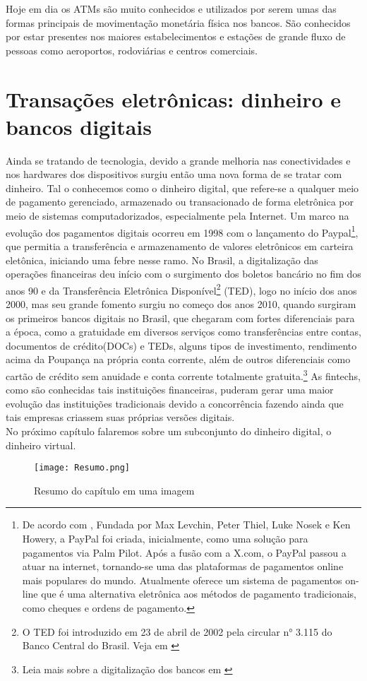 Hoje em dia os ATMs são muito conhecidos e utilizados por serem  umas das formas principais de movimentação monetária física nos  bancos. São conhecidos por estar presentes nos maiores estabelecimentos e estações de grande fluxo de pessoas como aeroportos, rodoviárias e centros comerciais. 



\section{Transações eletrônicas: dinheiro e bancos digitais}
Ainda se tratando de tecnologia, devido a grande melhoria nas conectividades e nos hardwares dos dispositivos surgiu então uma nova forma de se tratar com dinheiro. Tal o conhecemos como o dinheiro digital, que refere-se a qualquer meio de pagamento gerenciado, armazenado ou transacionado de forma eletrônica por meio de sistemas computadorizados, especialmente pela Internet. 
Um marco na evolução dos pagamentos digitais ocorreu em 1998 com o lançamento do Paypal\footnote{De acordo com	 \cite{CTECH}, Fundada por Max Levchin, Peter Thiel, Luke Nosek e Ken Howery, a PayPal foi criada, inicialmente, como uma solução para pagamentos via Palm Pilot. Após a fusão com a X.com, o PayPal passou a atuar na internet, tornando-se uma das plataformas de pagamentos online mais populares do mundo. Atualmente oferece um sistema de pagamentos on-line que é uma alternativa eletrônica aos métodos de pagamento tradicionais, como cheques e ordens de pagamento.}, que permitia a transferência e armazenamento de valores eletrônicos em carteira eletônica, iniciando uma febre nesse ramo. No Brasil, a digitalização das operações financeiras deu início com o surgimento dos boletos bancário no fim dos anos 90 e da Transferência Eletrônica Disponível\footnote{O TED foi introduzido em 23 de abril de 2002 pela circular n° 3.115 do Banco Central do Brasil. Veja em \cite{BCB}} (TED), logo no início  dos anos 2000, mas seu grande fomento surgiu no começo dos anos 2010, quando surgiram os primeiros bancos digitais no Brasil, que chegaram com fortes diferenciais  para a época, como a gratuidade em diversos serviços como transferências entre contas, documentos de crédito(DOCs) e TEDs, alguns tipos de investimento, rendimento acima da Poupança na própria conta corrente, além de outros diferenciais como cartão de crédito sem anuidade e conta corrente totalmente gratuita.\footnote{Leia mais sobre a digitalização dos bancos em \cite{DOMINA}} As fintechs, como são conhecidas tais instituições financeiras, puderam gerar uma maior evolução das instituições tradicionais devido a concorrência fazendo ainda que tais empresas criassem suas próprias versões digitais.\ \\

No próximo capítulo falaremos sobre um subconjunto do dinheiro digital, o dinheiro virtual. 

\begin{figure}[H]
	\centering
	\caption{Resumo do capítulo em uma imagem}
	\texttt{[image: Resumo.png]}
	\\
\end{figure}




